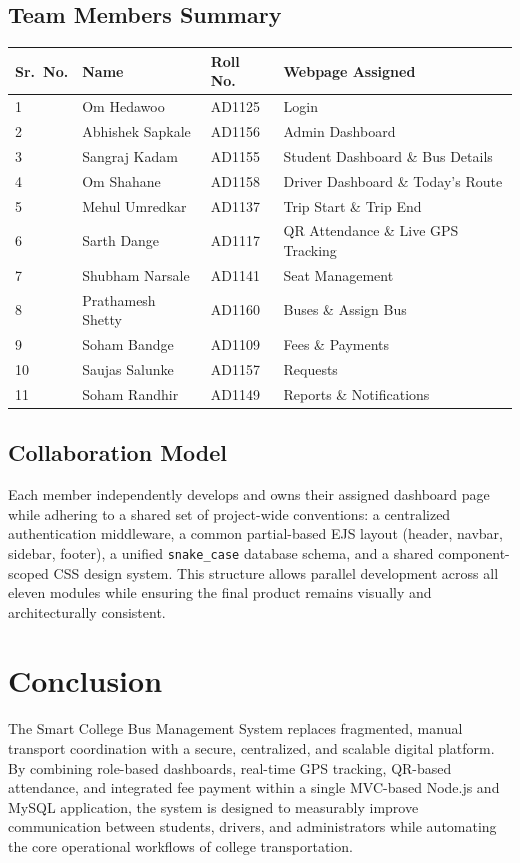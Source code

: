 \documentclass[11pt,a4paper]{report}
\begin{document}
\section{Team Members Summary}
\begin{longtable}{@{}p{1.4cm}p{4cm}p{2.4cm}p{5.3cm}@{}}
\toprule
\rowcolor{pine!10}\textbf{Sr.\ No.} & \textbf{Name} & \textbf{Roll No.} & \textbf{Webpage Assigned} \\
\midrule
\endhead
1 & Om Hedawoo & AD1125 & Login \\
2 & Abhishek Sapkale & AD1156 & Admin Dashboard \\
3 & Sangraj Kadam & AD1155 & Student Dashboard \& Bus Details \\
4 & Om Shahane & AD1158 & Driver Dashboard \& Today's Route \\
5 & Mehul Umredkar & AD1137 & Trip Start \& Trip End \\
6 & Sarth Dange & AD1117 & QR Attendance \& Live GPS Tracking \\
7 & Shubham Narsale & AD1141 & Seat Management \\
8 & Prathamesh Shetty & AD1160 & Buses \& Assign Bus \\
9 & Soham Bandge & AD1109 & Fees \& Payments \\
10 & Saujas Salunke & AD1157 & Requests \\
11 & Soham Randhir & AD1149 & Reports \& Notifications \\
\bottomrule
\end{longtable}

\section{Collaboration Model}
Each member independently develops and owns their assigned dashboard page while adhering to a shared set of project-wide conventions: a centralized authentication middleware, a common partial-based EJS layout (header, navbar, sidebar, footer), a unified \texttt{snake\_case} database schema, and a shared component-scoped CSS design system. This structure allows parallel development across all eleven modules while ensuring the final product remains visually and architecturally consistent.

\chapter{Conclusion}
The Smart College Bus Management System replaces fragmented, manual transport coordination with a secure, centralized, and scalable digital platform. By combining role-based dashboards, real-time GPS tracking, QR-based attendance, and integrated fee payment within a single MVC-based Node.js and MySQL application, the system is designed to measurably improve communication between students, drivers, and administrators while automating the core operational workflows of college transportation.
\end{document}
